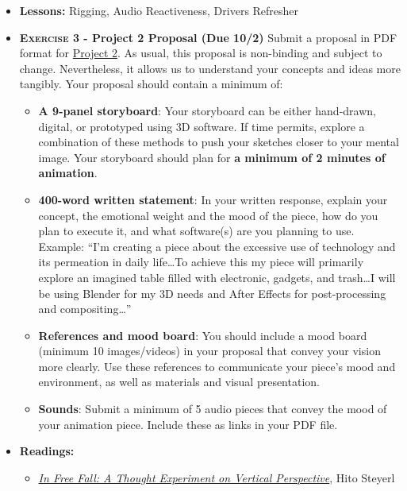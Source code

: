\def\dMon{2/22}%
\def\dTues{2/23}%
\def\dWed{2/24}%
\def\dThur{2/25}%
\placeDate

\def\tues{9/29}%
\def\thur{10/1}%
\def\fri{10/2}%
% 
\begin{itemize}[noitemsep,topsep=0pt,leftmargin=*]
    \item \textbf{Lessons:} Rigging, Audio Reactiveness, Drivers Refresher
    \item \textbf{\textsc{Exercise 3} - Project 2 Proposal (Due \fri)} Submit a proposal in PDF format for \hyperlink{project2}{Project 2}. As usual, this proposal is non-binding and subject to change. Nevertheless, it allows us to understand your concepts and ideas more tangibly. Your proposal should contain a minimum of:
          \begin{itemize}
              \item \textbf{A 9-panel storyboard}: Your storyboard can be either hand-drawn, digital, or prototyped using 3D software. If time permits, explore a combination of these methods to push your sketches closer to your mental image. Your storyboard should plan for \textbf{a minimum of 2 minutes of animation}.
              \item \textbf{400-word written statement}: In your written response, explain your concept, the emotional weight and the mood of the piece, how do you plan to execute it, and what software(s) are you planning to use. \newline
                    Example: ``I'm creating a piece about the excessive use of technology and its permeation in daily life\dots To achieve this my piece will primarily explore an imagined table filled with electronic, gadgets, and trash\dots I will be using Blender for my 3D needs and After Effects for post-processing and compositing\dots''
              \item \textbf{References and mood board}: You should include a mood board (minimum 10 images/videos) in your proposal that convey your vision more clearly. Use these references to communicate your piece's mood and environment, as well as materials and visual presentation.
              \item \textbf{Sounds}: Submit a minimum of 5 audio pieces that convey the mood of your animation piece. Include these as links in your PDF file.
          \end{itemize}
    \item \textbf{Readings:}
          \begin{itemize}
              \item \href{https://www.e-flux.com/journal/24/67860/in-free-fall-a-thought-experiment-on-vertical-perspective/}{\emph{In Free Fall: A Thought Experiment on Vertical Perspective}}, Hito Steyerl

\end{itemize}
\end{itemize}

